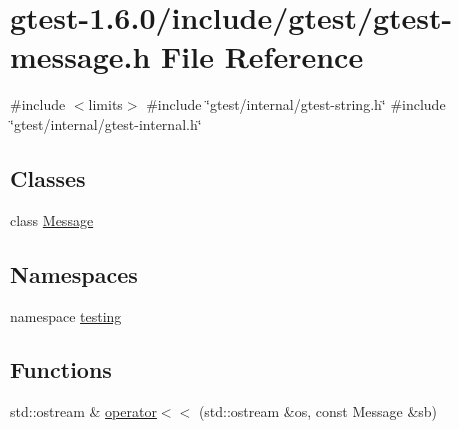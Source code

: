 \hypertarget{gtest-message_8h}{\section{gtest-\/1.6.0/include/gtest/gtest-\/message.h \-File \-Reference}
\label{d6/da4/gtest-message_8h}
}
{\ttfamily \#include $<$limits$>$}\*
{\ttfamily \#include \char`\"{}gtest/internal/gtest-\/string.\-h\char`\"{}}\*
{\ttfamily \#include \char`\"{}gtest/internal/gtest-\/internal.\-h\char`\"{}}\*
\subsection*{\-Classes}
\begin{DoxyCompactItemize}
\item 
class \hyperlink{classtesting_1_1Message}{\-Message}
\end{DoxyCompactItemize}
\subsection*{\-Namespaces}
\begin{DoxyCompactItemize}
\item 
namespace \hyperlink{namespacetesting}{testing}
\end{DoxyCompactItemize}
\subsection*{\-Functions}
\begin{DoxyCompactItemize}
\item 
std\-::ostream \& \hyperlink{namespacetesting_ae899d580f107a7756f3444213e211504}{operator$<$$<$} (std\-::ostream \&os, const \-Message \&sb)
\end{DoxyCompactItemize}
